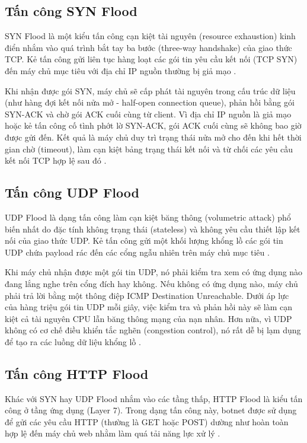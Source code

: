 \documentclass[../DoAn.tex]{subfiles}
\begin{document}
\subsection{Tấn công SYN Flood}
SYN Flood là một kiểu tấn công cạn kiệt tài nguyên (resource exhaustion) kinh điển nhắm vào quá trình bắt tay ba bước (three-way handshake) của giao thức TCP. Kẻ tấn công gửi liên tục hàng loạt các gói tin yêu cầu kết nối (TCP SYN) đến máy chủ mục tiêu với địa chỉ IP nguồn thường bị giả mạo \cite{mirkovic2004taxonomy, kurose2017computer}. 

Khi nhận được gói SYN, máy chủ sẽ cấp phát tài nguyên trong cấu trúc dữ liệu (như hàng đợi kết nối nửa mở - half-open connection queue), phản hồi bằng gói SYN-ACK và chờ gói ACK cuối cùng từ client. Vì địa chỉ IP nguồn là giả mạo hoặc kẻ tấn công cố tình phớt lờ SYN-ACK, gói ACK cuối cùng sẽ không bao giờ được gửi đến. Kết quả là máy chủ duy trì trạng thái nửa mở cho đến khi hết thời gian chờ (timeout), làm cạn kiệt bảng trạng thái kết nối và từ chối các yêu cầu kết nối TCP hợp lệ sau đó \cite{kurose2017computer}.

\subsection{Tấn công UDP Flood}
UDP Flood là dạng tấn công làm cạn kiệt băng thông (volumetric attack) phổ biến nhất do đặc tính không trạng thái (stateless) và không yêu cầu thiết lập kết nối của giao thức UDP. Kẻ tấn công gửi một khối lượng khổng lồ các gói tin UDP chứa payload rác đến các cổng ngẫu nhiên trên máy chủ mục tiêu \cite{mirkovic2004taxonomy}.

Khi máy chủ nhận được một gói tin UDP, nó phải kiểm tra xem có ứng dụng nào đang lắng nghe trên cổng đích hay không. Nếu không có ứng dụng nào, máy chủ phải trả lời bằng một thông điệp ICMP Destination Unreachable. Dưới áp lực của hàng triệu gói tin UDP mỗi giây, việc kiểm tra và phản hồi này sẽ làm cạn kiệt cả tài nguyên CPU lẫn băng thông mạng của nạn nhân. Hơn nữa, vì UDP không có cơ chế điều khiển tắc nghẽn (congestion control), nó rất dễ bị lạm dụng để tạo ra các luồng dữ liệu khổng lồ \cite{kurose2017computer}.

\subsection{Tấn công HTTP Flood}
Khác với SYN hay UDP Flood nhắm vào các tầng thấp, HTTP Flood là kiểu tấn công ở tầng ứng dụng (Layer 7). Trong dạng tấn công này, botnet được sử dụng để gửi các yêu cầu HTTP (thường là GET hoặc POST) dường như hoàn toàn hợp lệ đến máy chủ web nhằm làm quá tải năng lực xử lý \cite{mirkovic2004taxonomy}. 
\end{document}
